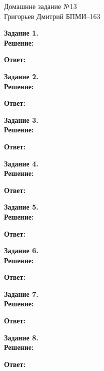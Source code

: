 \documentclass[12pt,a4paper]{scrartcl}
\begin{document}
	\begin{center}	
		Домашнне задание №13 \\
		Григорьев Дмитрий БПМИ--163
	\end{center}
	\textbf{Задание 1.} \\
	\textbf{Решение:}
	\begin{flushright}	
		\textbf{Ответ:}
	\end{flushright} 
	\textbf{Задание 2.}\\
	\textbf{Решение:}
	\begin{flushright}
		\textbf{Ответ:} 
	\end{flushright}
	\textbf{Задание 3.} 
	\\
	\textbf{Решение:}
	\begin{flushright}	
		\textbf{Ответ:}
	\end{flushright}
	\newpage
	\noindent
	\textbf{Задание 4.} 
	\\
	\textbf{Решение:} 
	\begin{flushright}
		\textbf{Ответ:}
	\end{flushright}
	\textbf{Задание 5.} 
	\\
	\textbf{Решение:} 
	\begin{flushright}
		\textbf{Ответ:}
	\end{flushright}
	\textbf{Задание 6.} 
	\\
	\textbf{Решение:} 
	\begin{flushright}
		\textbf{Ответ:}
	\end{flushright}
	\textbf{Задание 7.} 
	\\
	\textbf{Решение:}	
	\begin{flushright}
		\textbf{Ответ:}
	\end{flushright}
	\textbf{Задание 8.} 
	\\
	\textbf{Решение:} 
	\begin{flushright}
		\textbf{Ответ:}
	\end{flushright}
\end{document}
